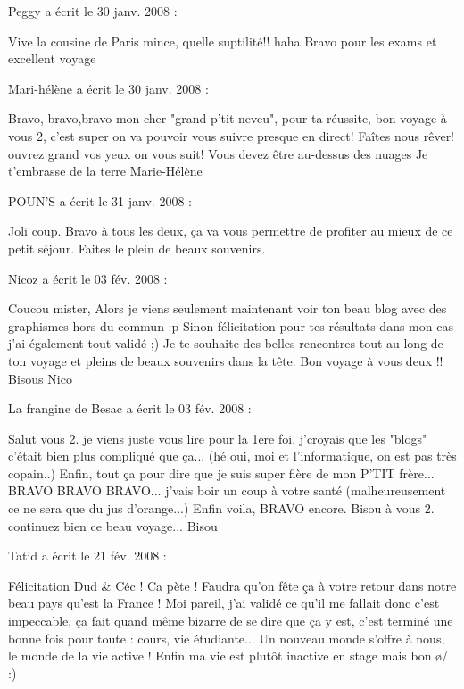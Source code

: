 \medskip
Peggy a écrit le 30 janv. 2008 :
\begin{displayquote}
Vive la cousine de Paris mince, quelle suptilité!! haha
Bravo pour les exams et excellent voyage
\end{displayquote}

\medskip
Mari-hélène a écrit le 30 janv. 2008 :
\begin{displayquote}
Bravo, bravo,bravo mon cher "grand p'tit neveu", pour ta réussite, bon voyage à vous 2, c'est super on va pouvoir vous suivre presque en direct! Faîtes nous rêver! ouvrez grand vos yeux on vous suit!
Vous devez être au-dessus des nuages
Je t'embrasse de la terre
Marie-Hélène
\end{displayquote}

\medskip
POUN'S a écrit le 31 janv. 2008 :
\begin{displayquote}
Joli coup.
Bravo à tous les deux, ça va vous permettre de profiter au mieux de ce petit séjour. Faites le plein de beaux souvenirs.
\end{displayquote}

\medskip
Nicoz a écrit le 03 fév. 2008 :
\begin{displayquote}
Coucou mister,
Alors je viens seulement maintenant voir ton beau blog avec des graphismes hors du commun :p
Sinon félicitation pour tes résultats dans mon cas j'ai également tout validé ;)
Je te souhaite des belles rencontres tout au long de ton voyage et pleins de beaux souvenirs dans la tête.
Bon voyage à vous deux !!
Bisous
Nico
\end{displayquote}

\medskip
La frangine de Besac a écrit le 03 fév. 2008 :
\begin{displayquote}
Salut vous 2. je viens juste vous lire pour la 1ere foi. j'croyais que les "blogs" c'était bien plus compliqué que ça... (hé oui, moi et l'informatique, on est pas très copain..)
Enfin, tout ça pour dire que je suis super fière de mon P'TIT frère... BRAVO BRAVO BRAVO... j'vais boir un coup à votre santé (malheureusement ce ne sera que du jus d'orange...)
Enfin voila, BRAVO encore.
Bisou à vous 2. continuez bien ce beau voyage...
Bisou
\end{displayquote}

\medskip
Tatid a écrit le 21 fév. 2008 :
\begin{displayquote}
Félicitation Dud \& Céc ! Ca pète !
Faudra qu'on fête ça à votre retour dans notre beau pays qu'est la France !
Moi pareil, j'ai validé ce qu'il me fallait donc c'est impeccable, ça fait quand même bizarre de se dire que ça y est, c'est terminé une bonne fois pour toute : cours, vie étudiante... Un nouveau monde s'offre à nous, le monde de la vie active ! Enfin ma vie est plutôt inactive en stage mais bon \o/ :)
\end{displayquote}
